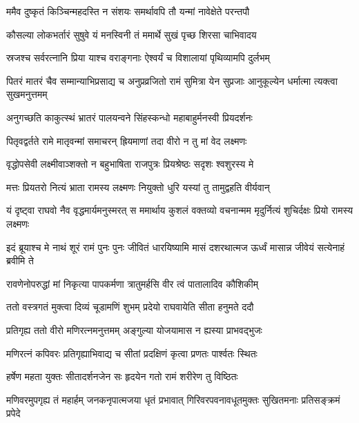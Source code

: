 \twolineshloka
{ममैव दुष्कृतं किञ्चिन्महदस्ति न संशयः}
{समर्थावपि तौ यन्मां नावेक्षेते परन्तपौ} %

\twolineshloka
{कौसल्या लोकभर्तारं सुषुवे यं मनस्विनी}
{तं ममार्थे सुखं पृच्छ शिरसा चाभिवादय} %

\twolineshloka
{स्रजश्च सर्वरत्नानि प्रिया याश्च वराङ्गनाः}
{ऐश्वर्यं च विशालायां पृथिव्यामपि दुर्लभम्} %

\threelineshloka
{पितरं मातरं चैव सम्मान्याभिप्रसाद्य च}
{अनुप्रव्रजितो रामं सुमित्रा येन सुप्रजाः}
{आनुकूल्येन धर्मात्मा त्यक्त्वा सुखमनुत्तमम्} %

\twolineshloka
{अनुगच्छति काकुत्स्थं भ्रातरं पालयन्वने}
{सिंहस्कन्धो महाबाहुर्मनस्वी प्रियदर्शनः} %

\twolineshloka
{पितृवद्वर्तते रामे मातृवन्मां समाचरन्}
{ह्रियमाणां तदा वीरो न तु मां वेद लक्ष्मणः} %

\twolineshloka
{वृद्धोपसेवी लक्ष्मीवाञ्शक्तो न बहुभाषिता}
{राजपुत्रः प्रियश्रेष्ठः सदृशः श्वशुरस्य मे} %

\twolineshloka
{मत्तः प्रियतरो नित्यं भ्राता रामस्य लक्ष्मणः}
{नियुक्तो धुरि यस्यां तु तामुद्वहति वीर्यवान्} %

\threelineshloka
{यं दृष्ट्वा राघवो नैव वृद्धमार्यमनुस्मरत्}
{स ममार्थाय कुशलं वक्तव्यो वचनान्मम}
{मृदुर्नित्यं शुचिर्दक्षः प्रियो रामस्य लक्ष्मणः} %

\threelineshloka
{इदं ब्रूयाश्च मे नाथं शूरं रामं पुनः पुनः}
{जीवितं धारयिष्यामि मासं दशरथात्मज}
{ऊर्ध्वं मासान्न जीवेयं सत्येनाहं ब्रवीमि ते} %

\twolineshloka
{रावणेनोपरुद्धां मां निकृत्या पापकर्मणा}
{त्रातुमर्हसि वीर त्वं पातालादिव कौशिकीम्} %

\twolineshloka
{ततो वस्त्रगतं मुक्त्वा दिव्यं चूडामणिं शुभम्}
{प्रदेयो राघवायेति सीता हनुमते ददौ} %

\twolineshloka
{प्रतिगृह्य ततो वीरो मणिरत्नमनुत्तमम्}
{अङ्गुल्या योजयामास न ह्यस्या प्राभवद्भुजः} %

\twolineshloka
{मणिरत्नं कपिवरः प्रतिगृह्याभिवाद्य च}
{सीतां प्रदक्षिणं कृत्वा प्रणतः पार्श्वतः स्थितः} %

\twolineshloka
{हर्षेण महता युक्तः सीतादर्शनजेन सः}
{हृदयेन गतो रामं शरीरेण तु विष्ठितः} %

\fourlineindentedshloka
{मणिवरमुपगृह्य तं महार्हम्}
{जनकनृपात्मजया धृतं प्रभावात्}
{गिरिवरपवनावधूतमुक्तः}
{सुखितमनाः प्रतिसङ्क्रमं प्रपेदे} %


